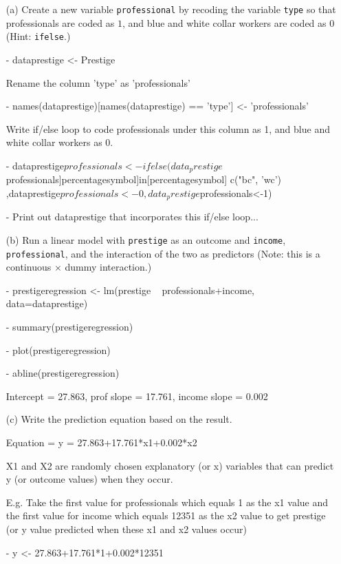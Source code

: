\documentclass[12pt,letterpaper]{article}
\begin{document}
\newpage
\begin{enumerate}
	
	\item [(a)]
	Create a new variable \texttt{professional} by recoding the variable \texttt{type} so that professionals are coded as $1$, and blue and white collar workers are coded as $0$ (Hint: \texttt{ifelse}.)
	
	- dataprestige <- Prestige

Rename the column 'type' as 'professionals'

- names(dataprestige)[names(dataprestige) == 'type'] <- 'professionals'

Write if/else loop to code professionals under this column as 1, and blue and white collar workers as 0.

- dataprestige$professionals <- ifelse(data_prestige$professionals]percentagesymbol]in[percentagesymbol] c("bc", 'wc') ,dataprestige$professionals<-0, data_prestige$professionals<-1)

- Print out dataprestige that incorporates this if/else loop...
	\vspace{6cm}

	
	\item [(b)]
	Run a linear model with \texttt{prestige} as an outcome and \texttt{income}, \texttt{professional}, and the interaction of the two as predictors (Note: this is a continuous $\times$ dummy interaction.)

	- prestigeregression <- lm(prestige ~ professionals+income, data=dataprestige)
	
	-	summary(prestigeregression)
	
	- plot(prestigeregression)
	
	- abline(prestigeregression)

Intercept = 27.863, prof slope = 17.761, income slope = 0.002
	\vspace{6cm}
	\item [(c)]
	Write the prediction equation based on the result.

Equation = y = 27.863+17.761*x1+0.002*x2

X1 and X2 are randomly chosen explanatory (or x) variables that can  predict y (or outcome values) when they occur. 

E.g. Take the first value for professionals which equals 1 as the x1 value and the first value for income which equals 12351 as the x2 value to get prestige (or y value predicted when these x1 and x2 values occur)

-	y <- 27.863+17.761*1+0.002*12351


\end{enumerate}
\end{document}
